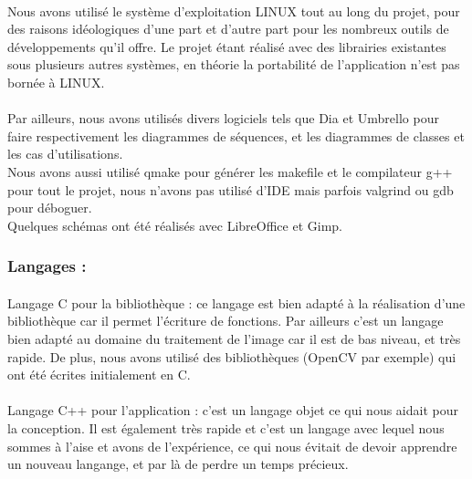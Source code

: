 \documentclass{report}
\begin{document}
			\paragraph{} Nous avons utilisé le système d'exploitation LINUX tout au long du projet, pour des raisons idéologiques d'une part et d'autre part pour les nombreux outils de développements qu'il offre. Le projet étant réalisé avec des librairies existantes sous plusieurs autres systèmes, en théorie la portabilité de l'application n'est pas bornée à LINUX.
			
			\paragraph{} Par ailleurs, nous avons utilisés divers logiciels tels que Dia et Umbrello pour faire respectivement les diagrammes de séquences, et les diagrammes de classes et les cas d'utilisations. \\
			Nous avons aussi utilisé qmake pour générer les makefile et le compilateur g++ pour tout le projet, nous n'avons pas utilisé d'IDE mais parfois valgrind ou gdb pour déboguer. \\
			Quelques schémas ont été réalisés avec LibreOffice et Gimp. \\
			\subsubsection{Langages :}
			\paragraph{} Langage C pour la bibliothèque : ce langage est bien adapté à la réalisation d'une bibliothèque car il permet l'écriture de fonctions. Par ailleurs c'est un langage bien adapté au domaine du traitement de l'image car il est de bas niveau, et très rapide. De plus, nous avons utilisé des bibliothèques (OpenCV par exemple) qui ont été écrites initialement en C.
			\paragraph{} Langage C++ pour l'application : c'est un langage objet ce qui nous aidait pour la conception. Il est également très rapide et c'est un langage avec lequel nous sommes à l'aise et avons de l'expérience, ce qui nous évitait de devoir apprendre un nouveau langange, et par là de perdre un temps précieux.\\
			
\end{document}
